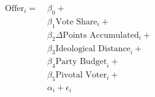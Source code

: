 \begin{equation}\label{eq:ols}
\begin{aligned}
\text{Offer}_{i} = \; & \beta_{0} + \\
                & \beta_{1}\text{Vote Share}_{i} + \\
                & \beta_{2}\Delta\text{Points Accumulated}_{i} + \\
                & \beta_{3}\text{Ideological Distance}_{i} + \\
                & \beta_{4}\text{Party Budget}_{i} + \\
                & \beta_{5}\text{Pivotal Voter}_{i} + \\
                & \alpha_{i} + \epsilon_{i}
\end{aligned}
\end{equation}